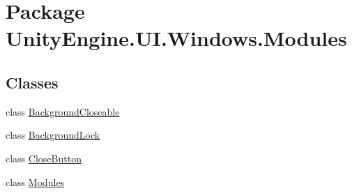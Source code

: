 \hypertarget{namespace_unity_engine_1_1_u_i_1_1_windows_1_1_modules}{}\section{Package Unity\+Engine.\+U\+I.\+Windows.\+Modules}
\label{namespace_unity_engine_1_1_u_i_1_1_windows_1_1_modules}
\subsection*{Classes}
\begin{DoxyCompactItemize}
\item 
class \hyperlink{class_unity_engine_1_1_u_i_1_1_windows_1_1_modules_1_1_background_closeable}{Background\+Closeable}
\item 
class \hyperlink{class_unity_engine_1_1_u_i_1_1_windows_1_1_modules_1_1_background_lock}{Background\+Lock}
\item 
class \hyperlink{class_unity_engine_1_1_u_i_1_1_windows_1_1_modules_1_1_close_button}{Close\+Button}
\item 
class \hyperlink{class_unity_engine_1_1_u_i_1_1_windows_1_1_modules_1_1_modules}{Modules}
\end{DoxyCompactItemize}
